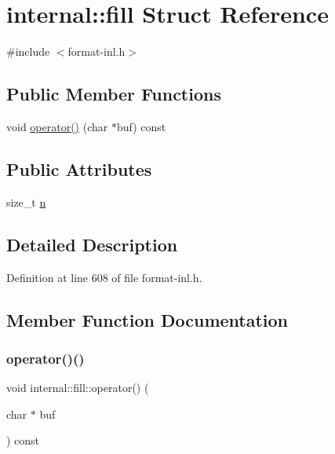 \hypertarget{structinternal_1_1fill}{}\section{internal\+:\+:fill Struct Reference}
\label{structinternal_1_1fill}


{\ttfamily \#include $<$format-\/inl.\+h$>$}

\subsection*{Public Member Functions}
\begin{DoxyCompactItemize}
\item 
void \hyperlink{structinternal_1_1fill_a608b9c6c7b8f2c6f164f4fceab7f4542}{operator()} (char $\ast$buf) const
\end{DoxyCompactItemize}
\subsection*{Public Attributes}
\begin{DoxyCompactItemize}
\item 
size\+\_\+t \hyperlink{structinternal_1_1fill_a3ba3938b1d30efc675dd1676d13d3bc2}{n}
\end{DoxyCompactItemize}


\subsection{Detailed Description}


Definition at line 608 of file format-\/inl.\+h.



\subsection{Member Function Documentation}
\mbox{\label{structinternal_1_1fill_a608b9c6c7b8f2c6f164f4fceab7f4542}} 
\subsubsection{\texorpdfstring{operator()()}{operator()()}}
{\footnotesize\ttfamily void internal\+::fill\+::operator() (\begin{DoxyParamCaption}\item[{char $\ast$}]{buf }\end{DoxyParamCaption}) const\hspace{0.3cm}{\ttfamily [inline]}}



